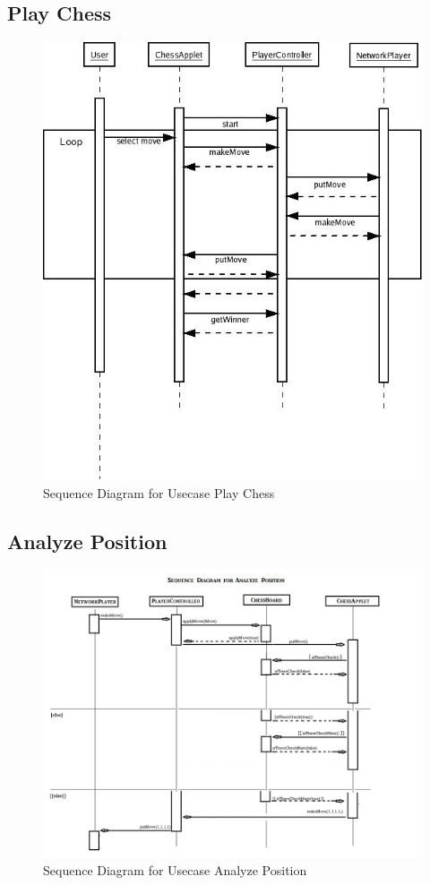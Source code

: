 \subsection{Play Chess}
\begin{figure}[H]
   \centering
   \includegraphics[scale=0.50]{seq_Play_Chess.jpg}
   \caption{Sequence Diagram for Usecase Play Chess}
  \end{figure}
\subsection{Analyze Position}
\begin{figure}[H]
   \centering
   \includegraphics[scale=0.50]{seq_Analyze_Position2.jpg}
   \caption{Sequence Diagram for Usecase Analyze Position}
  \end{figure}

